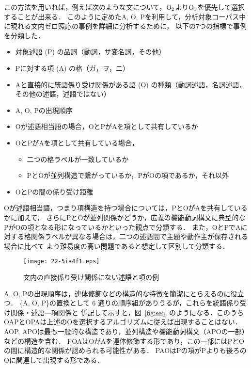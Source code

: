 \documentclass[japanese]{jnlp_1.4}
\begin{document}
\noindent
この方法を用いれば，例えば次のような文について，${\rm O}_2$より${\rm O}_1$を優先して選択することが出来る．
このように定めたA, O, Pを利用して，分析対象コーパス中に現れる文内ゼロ照応の事例を詳細に分析するために，
以下の7つの指標で事例を分類した．
\begin{itemize}
    \setlength{\parskip}{0cm} 
    \setlength{\itemsep}{0cm} 
    \item 対象述語 (P) の品詞（動詞，サ変名詞，その他）
    \item Pに対する項 (A) の格（ガ，ヲ，ニ）
    \item Aと直接的に統語係り受け関係がある語 (O) の種類（動詞述語，名詞述語，その他の述語，述語ではない）
    \item A, O, Pの出現順序
    \item Oが述語相当語の場合，OとPがAを項として共有しているか
    \item OとPがAを項として共有している場合，
    \begin{itemize}
        \item 二つの格ラベルが一致しているか
        \item PとOが並列構造で繋がっているか，PがOの項であるか，それ以外
    \end{itemize}
    \item OとPの間の係り受け距離
\end{itemize}
Oが述語相当語，つまり項構造を持つ場合については，PとOがAを共有しているかに加えて，
さらにPとOが並列関係かどうか，広義の機能動詞構文に典型的なPがOの項となる形になっているかといった観点で分類する．
また，OとPでAに対する格関係ラベルが異なる場合は，二つの述語間で主題や動作主が保存される場合に比べて
より難易度の高い問題であると想定して区別して分類する．

\begin{figure}[t]
\begin{center}
\texttt{[image: 22-5ia4f1.eps]}
\end{center}
\caption{文内の直接係り受け関係にない述語と項の例 \label{fig:ex1}}
\vspace{-1\Cvs}
\end{figure}

A, O, Pの出現順序は，連体修飾などの構造的な特徴を簡潔にとらえるのに役立つ．
\{A, O, P\}の置換として 6 通りの順序組がありうるが，これらを統語係り受け関係・述語—項関係と
併記して示すと，図~\ref{fig:seq}  
のようになる．このうちOAPとOPAは上述のOを選択するアルゴリズムに従えば出現することはない．
AOP, APOは最も一般的な構造であり，並列構造や機能動詞構文（APOの一部）などの構造を含む．
POAはOがAを連体修飾する形であり，この一部にはPとOの間に構造的な関係が認められる可能性がある．
PAOはPの項がPよりも後ろのOに関連して出現する形である．
\end{document}
